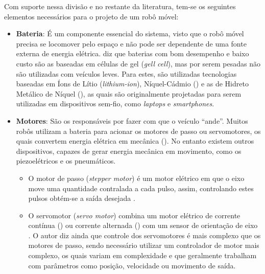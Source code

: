 Com suporte nessa divisão e no restante da literatura, tem-se os seguintes elementos necessários para o projeto de um robô móvel:
\begin{itemize}

\item[] \textbf{Bateria}: É um componente essencial do sistema, visto que o robô móvel precisa se locomover pelo espaço e não pode 
ser dependente de uma fonte externa de energia elétrica.  diz que baterias com bom desempenho e baixo custo são 
as baseadas em células de gel (\textit{gell cell}), 
mas por serem pesadas não são utilizadas com veículos 
leves. Para estes, são utilizadas tecnologias baseadas em Íons de Lítio (\textit{lithium-ion}), 
Níquel-Cádmio () e as de Hidreto Metálico de Níquel (), as quais são 
originalmente projetadas para serem utilizadas em dispositivos sem-fio, como \textit{laptops} e \textit{smartphones}.

\item[] \textbf{Motores}: 
São os responsáveis por fazer com que o veículo \textquotedblleft ande\textquotedblright. 
Muitos robôs utilizam a bateria para acionar os motores de passo ou servomotores, os quais convertem energia 
elétrica em mecânica (). No entanto existem outros dispositivos, capazes de gerar energia mecânica em movimento, 
como os piezoelétricos e os pneumáticos.\par
\begin{itemize}
 \item O motor de passo (\textit{stepper motor}) é um motor elétrico em que o eixo move uma quantidade contralada a cada pulso, assim, 
controlando estes pulsos obtém-se a saída desejada \cite{dudek_mobile}.\par
 \item O servomotor (\textit{servo motor}) combina um motor elétrico de corrente contínua 
() ou corrente alternada () com um sensor de orientação de eixo 
\cite{dudek_mobile}. 
O autor diz ainda que controle dos servomotores é mais complexo que os motores de passo, sendo necessário utilizar um controlador de 
motor mais complexo, os quais variam em complexidade e que geralmente trabalham com parâmetros como posição, velocidade ou 
movimento de saída.
\end{itemize}





\end{itemize}
